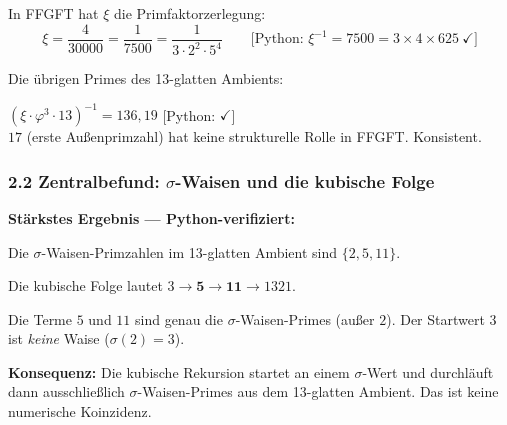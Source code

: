 In FFGFT hat $\xi$ die Primfaktorzerlegung:
\[
\xi = \frac{4}{30000} = \frac{1}{7500} = \frac{1}{3 \cdot 2^2 \cdot 5^4}
\qquad \text{[Python: } \xi^{-1} = 7500 = 3 \times 4 \times 625\ \checkmark\text{]}
\]

\begin{center}
\end{center}

Die übrigen Primes des 13-glatten Ambients:

\begin{center}
\end{center}

\begin{mdframed}[style=ok]
$(\xi \cdot \varphi^3 \cdot 13)^{-1} = 136{,}19$ [Python: $\checkmark$]\\
$17$ (erste Außenprimzahl) hat keine strukturelle Rolle in FFGFT. Konsistent.
\end{mdframed}

\subsubsection*{2.2 Zentralbefund: $\sigma$-Waisen und die kubische Folge}

\begin{mdframed}[style=ok]
\textbf{Stärkstes Ergebnis — Python-verifiziert:}

Die $\sigma$-Waisen-Primzahlen im 13-glatten Ambient sind $\{2, 5, 11\}$.

Die kubische Folge lautet $3 \to \mathbf{5} \to \mathbf{11} \to 1321$.

Die Terme $5$ und $11$ sind genau die $\sigma$-Waisen-Primes (außer $2$).
Der Startwert $3$ ist \textit{keine} Waise ($\sigma(2) = 3$).

\textbf{Konsequenz:} Die kubische Rekursion startet an einem $\sigma$-Wert
und durchläuft dann ausschließlich $\sigma$-Waisen-Primes aus dem 13-glatten
Ambient. Das ist keine numerische Koinzidenz.
\end{mdframed}

